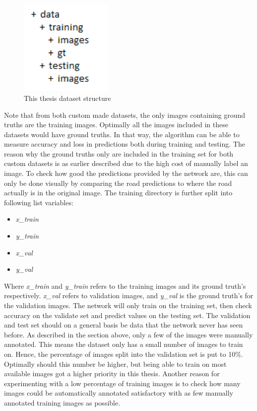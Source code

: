 \documentclass[USenglish]{ifimaster}  %
\begin{document}
\begin{figure}[ht]
    \centering
    \includegraphics[width=0.4\textwidth]{bilder/dataset_structure.PNG}
    \caption{This thesis dataset structure}
    \label{fig:dataset_structure}
\end{figure}

Note that from both custom made datasets, the only images containing ground truths are the training images. Optimally all the images included in these datasets would have ground truths. In that way, the algorithm can be able to measure accuracy and loss in predictions both during training and testing. The reason why the ground truths only are included in the training set for both custom datasets is as earlier described due to the high cost of manually label an image. To check how good the predictions provided by the network are, this can only be done visually by comparing the road predictions to where the road actually is in the original image.
\newline
\newline
The training directory is further split into following list variables:
\begin{itemize}
    \item \textit{x\_train}
    \item \textit{y\_train}
    \item \textit{x\_val}
    \item \textit{y\_val}
\end{itemize}
Where \textit{x\_train} and \textit{y\_train} refers to the training images and its ground truth's respectively. \textit{x\_val} refers to validation images, and \textit{y\_val} is the ground truth's for the validation images. The network will only train on the training set, then check accuracy on the validate set and predict values on the testing set. The validation and test set should on a general basis be data that the network never has seen before. As described in the section above, only a few of the images were manually annotated. This means the dataset only has a small number of images to train on. Hence, the percentage of images split into the validation set is put to 10\%. Optimally should this number be higher, but being able to train on most available images got a higher priority in this thesis. Another reason for experimenting with a low percentage of training images is to check how many images could be automatically annotated satisfactory with as few manually annotated training images as possible.
\end{document}
